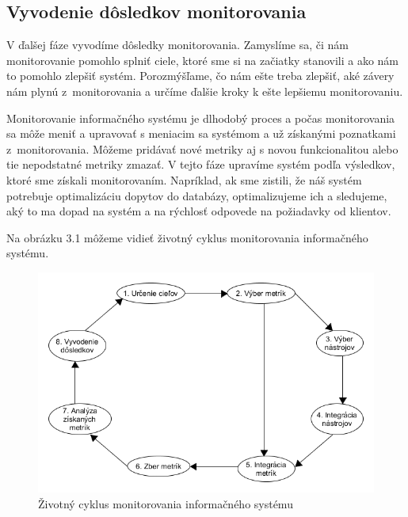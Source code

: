 \documentclass[a4paper, upjsfrontpage, disablespecwarning, thesismargins, thesislinespacing]{rnthesis}
\begin{document}
\subsection*{Vyvodenie dôsledkov monitorovania}

V ďalšej fáze vyvodíme dôsledky monitorovania.
Zamyslíme sa, či nám monitorovanie pomohlo splniť ciele, ktoré sme si na začiatky stanovili a ako nám to pomohlo zlepšiť systém.
Porozmýšľame, čo nám ešte treba zlepšiť, aké závery nám plynú z~monitorovania a určíme ďalšie kroky k ešte lepšiemu monitorovaniu.

Monitorovanie informačného systému je dlhodobý proces a počas monitorovania sa môže meniť a upravovať s meniacim sa systémom a už získanými poznatkami z~monitorovania.
Môžeme pridávať nové metriky aj s novou funkcionalitou alebo tie nepodstatné metriky zmazať.
V tejto fáze upravíme systém podľa výsledkov, ktoré sme získali monitorovaním.
Napríklad, ak sme zistili, že náš systém potrebuje optimalizáciu dopytov do databázy, optimalizujeme ich a sledujeme, aký to ma dopad na systém a na rýchlosť odpovede na požiadavky od klientov.

Na obrázku 3.1 môžeme vidieť životný cyklus monitorovania informačného systému.

\begin{figure}
\begin{center}
\includegraphics[scale=0.7]{ais_algorithm.png}
\caption{Životný cyklus monitorovania informačného systému}
\end{center}
\end{figure}

\newpage

\end{document}
